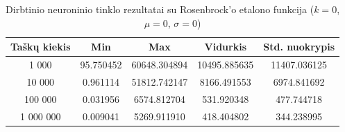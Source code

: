 \begin{table}[H]
    \centering
    \begin{tabular}{|c|c|c|c|c|}
        \hline
        \textbf{Taškų kiekis} & \textbf{Min} & \textbf{Max} & \textbf{Vidurkis} & \textbf{Std. nuokrypis} \\ \hline
        1 000        & 95.750452 & 60648.304894 & 10495.885635 & 11407.036125 \\ \hline
        10 000       & 0.961114 & 51812.742147 & 8166.491553 & 6974.841692 \\ \hline
        100 000      & 0.031956 & 6574.812704 & 531.920348 & 477.744718 \\ \hline
        1 000 000    & 0.009041 & 5269.911910 & 418.404802 & 344.238995 \\ \hline
    \end{tabular}
    \caption{Dirbtinio neuroninio tinklo rezultatai su Rosenbrock'o etalono funkcija ($k = 0$, $\mu = 0$, $\sigma = 0$)}
\end{table}